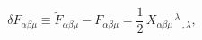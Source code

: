 \begin{equation}
\delta F_{\alpha\beta\mu} \equiv \tilde{F}_{\alpha\beta\mu} -
F_{\alpha\beta\mu} = \frac{1}{2} \, X_{\alpha\beta\mu}{}^{\,\lambda}{}_{\,
,\lambda},
\end{equation}

